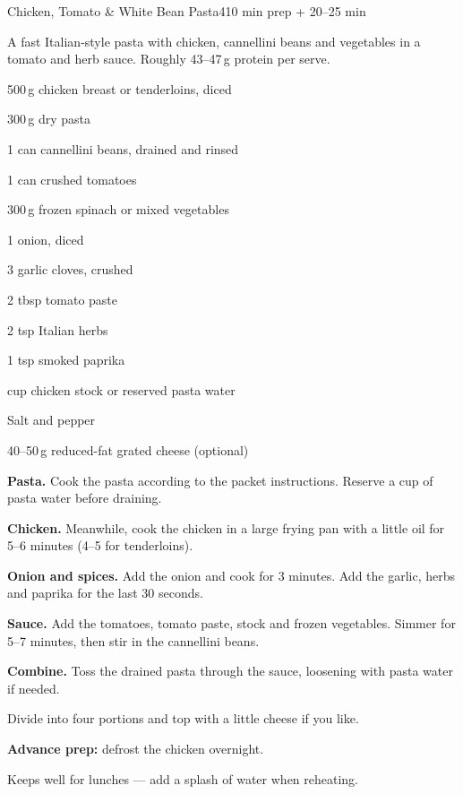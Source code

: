 \begin{recipebox}{Chicken, Tomato \& White Bean Pasta}{4}{10 min prep + 20--25 min}

A fast Italian-style pasta with chicken, cannellini beans and vegetables in a
tomato and herb sauce. Roughly 43--47\,g protein per serve.

\begin{ingredients}
  \item 500\,g chicken breast or tenderloins, diced
  \item 300\,g dry pasta
  \item 1 can cannellini beans, drained and rinsed
  \item 1 can crushed tomatoes
  \item 300\,g frozen spinach or mixed vegetables
  \item 1 onion, diced
  \item 3 garlic cloves, crushed
  \item 2 tbsp tomato paste
  \item 2 tsp Italian herbs
  \item 1 tsp smoked paprika
  \item {} cup chicken stock or reserved pasta water
  \item Salt and pepper
  \item 40--50\,g reduced-fat grated cheese (optional)
\end{ingredients}

\begin{method}
  \item \textbf{Pasta.} Cook the pasta according to the packet instructions. Reserve a cup of pasta water before draining.
  \item \textbf{Chicken.} Meanwhile, cook the chicken in a large frying pan with a little oil for 5--6 minutes (4--5 for tenderloins).
  \item \textbf{Onion and spices.} Add the onion and cook for 3 minutes. Add the garlic, herbs and paprika for the last 30 seconds.
  \item \textbf{Sauce.} Add the tomatoes, tomato paste, stock and frozen vegetables. Simmer for 5--7 minutes, then stir in the cannellini beans.
  \item \textbf{Combine.} Toss the drained pasta through the sauce, loosening with pasta water if needed.
  \item Divide into four portions and top with a little cheese if you like.
\end{method}

\begin{notelist}
  \item \textbf{Advance prep:} defrost the chicken overnight.
  \item Keeps well for lunches --- add a splash of water when reheating.
\end{notelist}

\end{recipebox}
